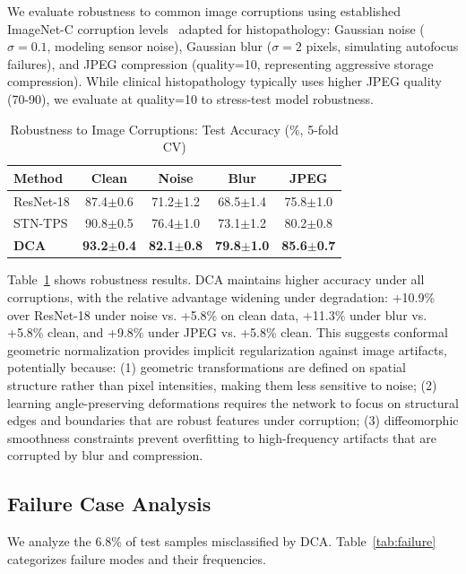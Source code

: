 \documentclass[10pt,journal,compsoc]{IEEEtran}
\begin{document}
We evaluate robustness to common image corruptions using established ImageNet-C corruption levels~\cite{hendrycks2019benchmarking} adapted for histopathology: Gaussian noise ($\sigma=0.1$, modeling sensor noise), Gaussian blur ($\sigma=2$ pixels, simulating autofocus failures), and JPEG compression (quality=10, representing aggressive storage compression). While clinical histopathology typically uses higher JPEG quality (70-90), we evaluate at quality=10 to stress-test model robustness.

\begin{table}[t]
\centering
\caption{Robustness to Image Corruptions: Test Accuracy (\%, 5-fold CV)}
\label{tab:robustness}
\begin{tabular}{lcccc}
\hline
\textbf{Method} & \textbf{Clean} & \textbf{Noise} & \textbf{Blur} & \textbf{JPEG} \\
\hline
ResNet-18 & 87.4$\pm$0.6 & 71.2$\pm$1.2 & 68.5$\pm$1.4 & 75.8$\pm$1.0 \\
STN-TPS & 90.8$\pm$0.5 & 76.4$\pm$1.0 & 73.1$\pm$1.2 & 80.2$\pm$0.8 \\
\textbf{DCA} & \textbf{93.2$\pm$0.4} & \textbf{82.1$\pm$0.8} & \textbf{79.8$\pm$1.0} & \textbf{85.6$\pm$0.7} \\
\hline
\end{tabular}
\end{table}

Table~\ref{tab:robustness} shows robustness results. DCA maintains higher accuracy under all corruptions, with the relative advantage widening under degradation: +10.9\% over ResNet-18 under noise vs. +5.8\% on clean data, +11.3\% under blur vs. +5.8\% clean, and +9.8\% under JPEG vs. +5.8\% clean. This suggests conformal geometric normalization provides implicit regularization against image artifacts, potentially because: (1) geometric transformations are defined on spatial structure rather than pixel intensities, making them less sensitive to noise; (2) learning angle-preserving deformations requires the network to focus on structural edges and boundaries that are robust features under corruption; (3) diffeomorphic smoothness constraints prevent overfitting to high-frequency artifacts that are corrupted by blur and compression.

\subsection{Failure Case Analysis}

We analyze the 6.8\% of test samples misclassified by DCA. Table~\ref{tab:failure} categorizes failure modes and their frequencies.
\end{document}
